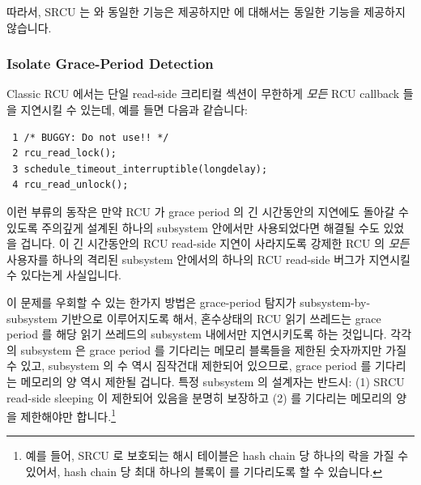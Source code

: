 따라서, SRCU 는  와 동일한 기능은 제공하지만
 에 대해서는 동일한 기능을 제공하지 않습니다.

\subsubsection{Isolate Grace-Period Detection}
\label{sec:app:rcuimpl:Isolate Grace-Period Detection}

Classic RCU 에서는 단일 read-side 크리티컬 섹션이 무한하게 \emph{모든} RCU
callback 들을 지연시킬 수 있는데, 예를 들면 다음과 같습니다:

\vspace{5pt}
\begin{minipage}[t]{\columnwidth}
\scriptsize
\begin{verbatim}
 1 /* BUGGY: Do not use!! */
 2 rcu_read_lock();
 3 schedule_timeout_interruptible(longdelay);
 4 rcu_read_unlock();
\end{verbatim}
\end{minipage}
\vspace{5pt}

이런 부류의 동작은 만약 RCU 가 grace period 의 긴 시간동안의 지연에도 돌아갈 수
있도록 주의깊게 설계된 하나의 subsystem 안에서만 사용되었다면 해결될 수도
있었을 겁니다.
이 긴 시간동안의 RCU read-side 지연이 사라지도록 강제한 RCU 의 \emph{모든}
사용자를 하나의 격리된 subsystem 안에서의 하나의 RCU read-side 버그가 지연시킬
수 있다는게 사실입니다.

이 문제를 우회할 수 있는 한가지 방법은 grace-period 탐지가
subsystem-by-subsystem 기반으로 이루어지도록 해서, 혼수상태의 RCU 읽기 쓰레드는
grace period 를 해당 읽기 쓰레드의 subsystem 내에서만 지연시키도록 하는
것입니다.
각각의 subsystem 은 grace period 를 기다리는 메모리 블록들을 제한된 숫자까지만
가질 수 있고, subsystem 의 수 역시 짐작건대 제한되어 있으므로, grace period 를
기다리는 메모리의 양 역시 제한될 겁니다.
특정 subsystem 의 설계자는 반드시: (1) SRCU read-side sleeping 이 제한되어
있음을 분명히 보장하고 (2)  를 기다리는 메모리의 양을
제한해야만 합니다.\footnote{
	예를 들어, SRCU 로 보호되는 해시 테이블은 hash chain 당 하나의 락을
	가질 수 있어서, hash chain 당 최대 하나의 블록이
	 를 기다리도록 할 수 있습니다.}

